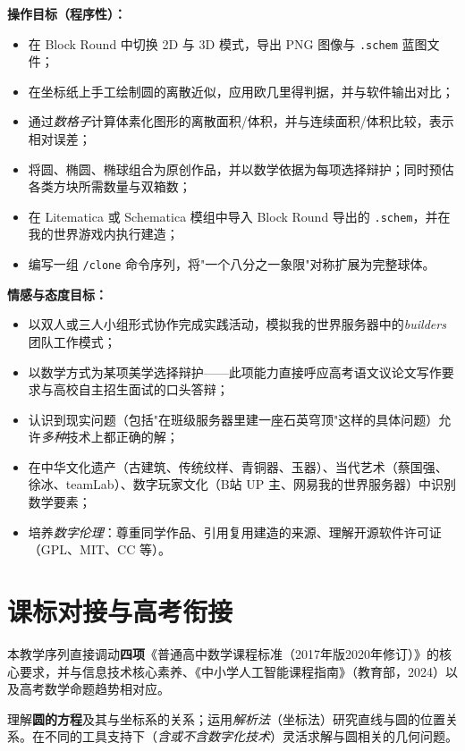 \documentclass[12pt,a4paper]{scrartcl}
\newcommand{\acc}[1]{\textcolor{accent}{\textbf{#1}}}
\newcommand{\cmd}[1]{\textcolor{earth}{\texttt{\small #1}}}
\begin{document}
\textbf{操作目标（程序性）：}
\begin{itemize}[leftmargin=1.3em,itemsep=0.2em,topsep=0.3em]
  \item 在 Block Round 中切换 2D 与 3D 模式，导出 PNG 图像与 \texttt{.schem} 蓝图文件；
  \item 在坐标纸上手工绘制圆的离散近似，应用欧几里得判据，并与软件输出对比；
  \item 通过\emph{数格子}计算体素化图形的离散面积/体积，并与连续面积/体积比较，表示相对误差；
  \item 将圆、椭圆、椭球组合为原创作品，并以数学依据为每项选择辩护；同时预估各类方块所需数量与双箱数；
  \item 在 Litematica 或 Schematica 模组中导入 Block Round 导出的 \texttt{.schem}，并在我的世界游戏内执行建造；
  \item 编写一组 \cmd{/clone} 命令序列，将"一个八分之一象限"对称扩展为完整球体。
\end{itemize}

\textbf{情感与态度目标：}
\begin{itemize}[leftmargin=1.3em,itemsep=0.2em,topsep=0.3em]
  \item 以双人或三人小组形式协作完成实践活动，模拟我的世界服务器中的\emph{builders} 团队工作模式；
  \item 以数学方式为某项美学选择辩护——此项能力直接呼应高考语文议论文写作要求与高校自主招生面试的口头答辩；
  \item 认识到现实问题（包括"在班级服务器里建一座石英穹顶"这样的具体问题）允许\emph{多种}技术上都正确的解；
  \item 在中华文化遗产（古建筑、传统纹样、青铜器、玉器）、当代艺术（蔡国强、徐冰、teamLab）、数字玩家文化（B站 UP 主、网易我的世界服务器）中识别数学要素；
  \item 培养\emph{数字伦理}：尊重同学作品、引用复用建造的来源、理解开源软件许可证（GPL、MIT、CC 等）。
\end{itemize}

\section{课标对接与高考衔接}\label{sec:bncc}

本教学序列直接调动\acc{四项}《普通高中数学课程标准（2017年版2020年修订）》的核心要求，并与信息技术核心素养、《中小学人工智能课程指南》（教育部，2024）以及高考数学命题趋势相对应。

\begin{biaozhun}
理解\acc{圆的方程}及其与坐标系的关系；运用\emph{解析法}（坐标法）研究直线与圆的位置关系。在不同的工具支持下（\emph{含或不含数字化技术}）灵活求解与圆相关的几何问题。
\end{biaozhun}
\end{document}
